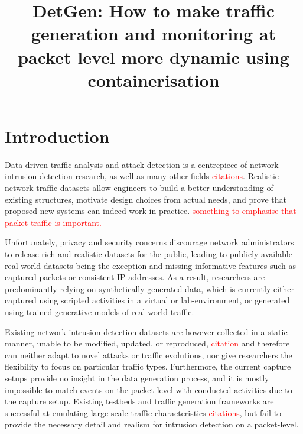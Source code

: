 \documentclass{article}
\begin{document}
\title{DetGen: How to make traffic generation and monitoring at packet level more dynamic using containerisation}

\maketitle

\section{Introduction}

Data-driven traffic analysis and attack detection is a centrepiece of network intrusion detection research, as well as many other fields \textcolor{red}{citations}. Realistic network traffic datasets allow engineers to build a better understanding of existing structures, motivate design choices from actual needs, and prove that proposed new systems can indeed work in practice. \textcolor{red}{something to emphasise that packet traffic is important.}

Unfortunately, privacy and security concerns discourage network administrators to release rich and realistic datasets for the public,  leading to publicly available real-world datasets being the exception and missing informative features such as captured packets or consistent IP-addresses. As a result, researchers are predominantly relying on synthetically generated data, which is currently either captured using scripted activities in a virtual or lab-environment, or generated using trained generative models of real-world traffic.

Existing network intrusion detection datasets are however collected in a static manner, unable to be modified, updated, or reproduced, \textcolor{red}{citation} and therefore can neither adapt to novel attacks or traffic evolutions, nor give researchers the flexibility to focus on particular traffic types. Furthermore, the current capture setups provide no insight in the data generation process, and it is mostly impossible to match events on the packet-level with conducted activities due to the capture setup. 
Existing testbeds and traffic generation frameworks are successful at emulating large-scale traffic characteristics \textcolor{red}{citations}, but fail to provide the necessary detail and realism for intrusion detection on a packet-level. 

\end{document}

